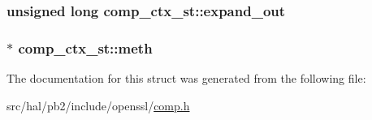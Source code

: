 \subsubsection[{\texorpdfstring{expand\+\_\+out}{expand_out}}]{\setlength{\rightskip}{0pt plus 5cm}unsigned long comp\+\_\+ctx\+\_\+st\+::expand\+\_\+out}\hypertarget{structcomp__ctx__st_acddf6014a55ffef5a232046f63d4f8a6}{}\label{structcomp__ctx__st_acddf6014a55ffef5a232046f63d4f8a6}
\subsubsection[{\texorpdfstring{meth}{meth}}]{$\ast$ comp\+\_\+ctx\+\_\+st\+::meth}\hypertarget{structcomp__ctx__st_accd49b9ff8bafe3fa01c8cadc597b855}{}\label{structcomp__ctx__st_accd49b9ff8bafe3fa01c8cadc597b855}


The documentation for this struct was generated from the following file\+:\begin{DoxyCompactItemize}
\item 
src/hal/pb2/include/openssl/\hyperlink{comp_8h}{comp.\+h}\end{DoxyCompactItemize}
